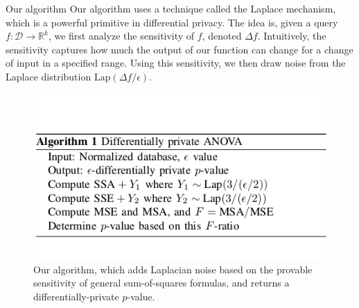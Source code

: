 \documentclass[final]{beamer}
\newlength{\onecolwid}
\newlength{\twocolwid}
\begin{document}
\begin{frame}[t]
\begin{columns}[t]
\begin{column}{\twocolwid}
\begin{columns}[t,totalwidth=\twocolwid]
\begin{column}{\onecolwid}

\begin{block}{Our algorithm}
Our algorithm uses a technique called the Laplace mechanism, which is a powerful primitive in 
differential privacy. The idea is, given a query $f:\mathcal{D}\to\mathbb{R}^{k}$, we first analyze the sensitivity of $f$, denoted $\Delta f$. Intuitively, the sensitivity captures how much the output of our function can change for a change of input in a specified range. Using this sensitivity, we then draw noise from the Laplace distribution $\text{Lap}(\Delta f / \epsilon)$.

\begin{figure}
\includegraphics[width=1.0\linewidth]{algorithm.png}
\caption{Our algorithm, which adds Laplacian noise based on the provable sensitivity of 
	general sum-of-squares formulas, and returns a differentially-private $p$-value.}
\end{figure}


\end{block}


\end{column} %

\end{columns} %


\begin{columns}[t,totalwidth=\twocolwid] %


\end{columns}
\end{column}
\end{columns}
\end{frame}
\end{document}
